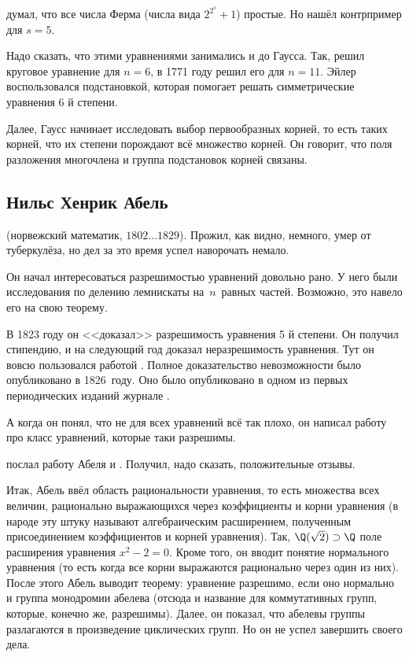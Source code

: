 \documentclass[a4paper,oneside,fleqn,10pt]{article}
\newcommand{\pe}[2]{${#1}\ldots{#2}$}
\begin{document}
 думал, что все числа Ферма (числа вида $2^{2^s} + 1$)
простые. Но  нашёл контрпример для $s=5$.

Надо сказать, что этими уравнениями занимались и до Гаусса.  Так,
 решил круговое уравнение для $n=6$, в 1771 году
 решил его для $n=11$.  Эйлер воспользовался
подстановкой, которая помогает решать симметрические уравнения 6 й
степени.

Далее, Гаусс начинает исследовать выбор первообразных корней, то есть
таких корней, что их степени порождают всё множество корней.  Он
говорит, что поля разложения многочлена и группа подстановок корней
связаны.

\subsection{Нильс Хенрик Абель}

 (норвежский математик,
\pe{1802}{1829}).  Прожил, как видно, немного, умер от туберкулёза, но
дел за это время успел наворочать немало.

Он начал интересоваться разрешимостью уравнений довольно рано.  У него
были исследования по делению лемнискаты на~$n$~равных частей.
Возможно, это навело его на свою теорему.

В 1823 году он <<доказал>> разрешимость уравнения 5 й степени. Он
получил стипендию, и на следующий год доказал неразрешимость
уравнения. Тут он вовсю пользовался работой . Полное
доказательство невозможности было опубликовано в 1826~году.  Оно было
опубликовано в одном из первых периодических изданий журнале
.

А когда он понял, что не для всех уравнений всё так плохо, он написал
работу про класс уравнений, которые таки разрешимы.

 послал работу Абеля  и
.  Получил, надо сказать, положительные отзывы.

Итак, Абель ввёл область рациональности уравнения, то есть множества
всех величин, рационально выражающихся через коэффициенты и корни
уравнения (в народе эту штуку называют алгебраическим расширением,
полученным присоединением коэффициентов и корней уравнения).  Так,
$\Q(\sqrt2) \supset \Q$ поле расширения уравнения $x^2 -2=0$.  Кроме
того, он вводит понятие нормального уравнения (то есть когда все корни
выражаются рационально через один из них). После этого Абель выводит
теорему: уравнение разрешимо, если оно нормально и группа монодромии
абелева (отсюда и название для коммутативных групп, которые, конечно
же, разрешимы).  Далее, он показал, что абелевы группы разлагаются в
произведение циклических групп.  Но он не успел завершить своего дела.
\end{document}
